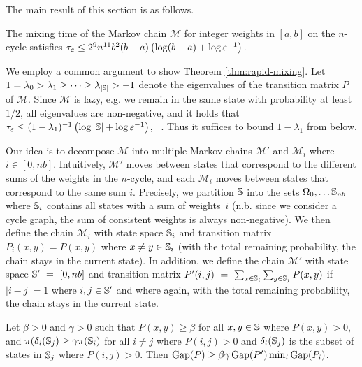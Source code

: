 The main result of this section is as follows.
\begin{theorem}
	The mixing time \mixtime of the Markov chain $\mathcal{M}$ for integer weights in $[a, b]$ on the $n$-cycle satisfies
	$
	\tau_{\varepsilon} \leq 2^{9} n^{11} b^2 (b - a) \left(\log (b - a) + \log \varepsilon^{-1} \right).
	$
	\label{thm:rapid-mixing}
\end{theorem}

\noindent
We employ a common argument to show Theorem \autoref{thm:rapid-mixing}.
Let $1 = \lambda_0 > \lambda_1 \geq \dots \geq \lambda_{|\mathbb S|} > -1$ denote the eigenvalues of the transition matrix $P$ of $\mathcal{M}$.
Since $\mathcal{M}$ is lazy, e.g. we remain in the same state with probability at least $1 / 2$, all eigenvalues are non-negative, and it holds that $\tau_{\varepsilon} \leq (1 - \lambda_1)^{-1} \left(\log |\mathbb S| + \log \varepsilon^{-1} \right)$, \eg~\cite[p. 4]{sinclair1992improved}.
Thus it suffices to bound $1 - \lambda_1$ from below.

Our idea is to decompose $\mathcal{M}$ into multiple Markov chains $\mathcal{M'}$ and $\mathcal{M}_i$ where $i \in [0, nb]$.
Intuitively, $\mathcal{M'}$ moves between states that correspond to the different sums of the weights in the $n$-cycle, and each $\mathcal{M}_i$ moves between states that correspond to the same sum $i$.
Precisely, we partition $\mathbb S$ into the sets $\Omega_0, \dots \mathbb S_{nb}$ where $\mathbb S_i$ contains all states with a sum of weights~$i$ (n.b. since we consider a cycle graph, the sum of consistent weights is always non-negative).
We then define the chain $\mathcal{M}_i$ with state space $\mathbb S_i$ and transition matrix $P_i(x, y) = P(x, y)$ where $x \neq y \in \mathbb S_i$ (with the total remaining probability, the chain stays in the current state).
In addition, we define the chain $\mathcal{M'}$ with state space $\mathbb S'~=~[0, nb]$ and transition matrix $P'(i, j)~=~\sum_{x \in \mathbb S_i} \sum_{y \in \mathbb S_j} P(x, y)$ if $|i - j| = 1$ where $i, j \in \mathbb S'$ and where again, with the total remaining probability, the chain stays in the current state.

\begin{lemma}
    \label{lem:mc-decomp}
    Let $\beta > 0$ and $\gamma > 0$ such that $P(x, y) \geq \beta$ for all $x, y \in \mathbb S$ where $P(x, y) > 0$, and $\pi(\delta_i(\mathbb S_j) \geq \gamma \pi(\mathbb S_i)$ for all $i \neq j$ where $P(i, j) > 0$ and $\delta_i(\mathbb S_j)$ is the subset of states in $\mathbb S_j$ where $P(i, j) > 0$.
    Then $\operatorname{Gap}(P) \geq \beta \gamma \operatorname{Gap}(P') \min_i \operatorname{Gap}(P_i)$.
\end{lemma}

